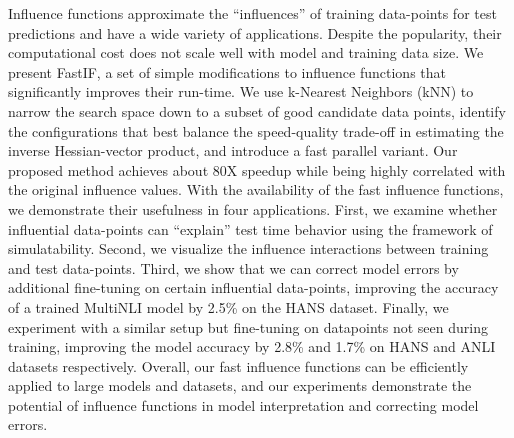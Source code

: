 Influence functions approximate the ``influences'' of training data-points for test predictions and have a wide variety of applications. Despite the popularity, their computational cost does not scale well with model and training data size. We present FastIF, a set of simple modifications to influence functions that significantly improves their run-time. We use k-Nearest Neighbors (kNN) to narrow the search space down to a subset of good candidate data points, identify the configurations that best balance the speed-quality trade-off in estimating the inverse Hessian-vector product, and introduce a fast parallel variant. Our proposed method achieves about 80X speedup while being highly correlated with the original influence values. With the availability of the fast influence functions, we demonstrate their usefulness in four applications. First, we examine whether influential data-points can ``explain'' test time behavior using the framework of simulatability. Second, we visualize the influence interactions between training and test data-points. Third, we show that we can correct model errors by additional fine-tuning on certain influential data-points, improving the accuracy of a trained MultiNLI model by 2.5\% on the HANS dataset. Finally, we experiment with a similar setup but fine-tuning on datapoints not seen during training, improving the model accuracy by 2.8\% and 1.7\% on HANS and ANLI datasets respectively. Overall, our fast influence functions can be efficiently applied to large models and datasets, and our experiments demonstrate the potential of influence functions in model interpretation and correcting model errors.
